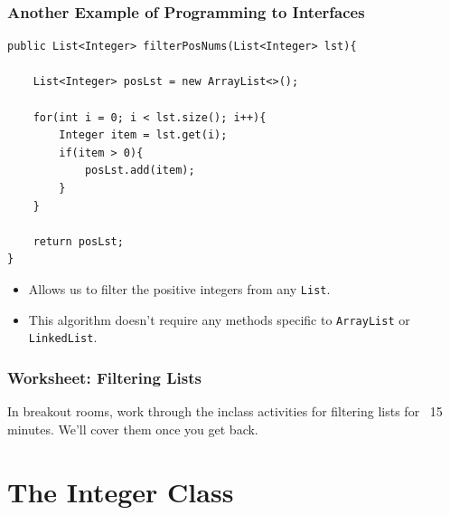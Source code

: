 \documentclass{beamer}
\begin{document}
\begin{frame}[fragile]
    \frametitle{Another Example of Programming to Interfaces}
    \centering
    \begin{lstlisting}[basicstyle=\scriptsize, frame=trBL]
public List<Integer> filterPosNums(List<Integer> lst){

    List<Integer> posLst = new ArrayList<>();

    for(int i = 0; i < lst.size(); i++){
        Integer item = lst.get(i);
        if(item > 0){
            posLst.add(item);
        }
    }

    return posLst;
}

    \end{lstlisting}
    \begin{itemize}
        \item Allows us to filter the positive integers from any \lstinline|List|.
        \item This algorithm doesn't require any methods specific to \lstinline|ArrayList| or \lstinline|LinkedList|.
    \end{itemize}
\end{frame}

\begin{frame}
    \frametitle{Worksheet: Filtering Lists}
    \vfill
    In breakout rooms, work through the inclass activities for filtering lists for ~15 minutes. We'll cover them once you get back.
    \vfill
\end{frame}

\section{The Integer Class}
\end{document}
